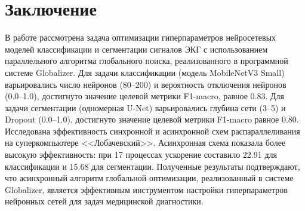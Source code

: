 \documentclass[11pt, oneside, a4paper]{article}
\begin{document}


\section{Заключение}
\label{sec-conclusion}

В работе рассмотрена задача оптимизации гиперпараметров нейросетевых моделей классификации и сегментации сигналов ЭКГ с использованием параллельного алгоритма глобального поиска, реализованного в программной системе Globalizer. Для задачи классификации (модель MobileNetV3 Small) варьировались число нейронов (80--200) и вероятность отключения нейронов (0.0--1.0), достигнуто значение целевой метрики F1-macro, равное 0.83. Для задачи сегментации (одномерная U-Net) варьировались глубина сети (3--5) и Dropout (0.0--1.0), достигнуто значение целевой метрики F1-macro равное 0.80. Исследована эффективность синхронной и асинхронной схем распараллеливания на суперкомпьютере <<Лобачевский>>. Асинхронная схема показала более высокую эффективность: при 17 процессах ускорение составило 22.91 для классификации и 15.68 для сегментации. Полученные результаты подтверждают, что асинхронный алгоритм глобальной оптимизации, реализованный в системе Globalizer, является эффективным инструментом настройки гиперпараметров нейронных сетей для задач медицинской диагностики.
\end{document}
